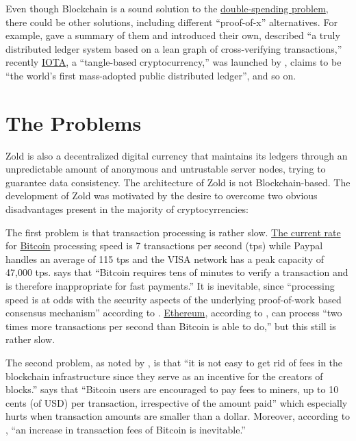 \documentclass{main}
\begin{document}
Even though Blockchain is a sound solution to the
\href{https://en.wikipedia.org/wiki/Double-spending}{double-spending problem},
there could be other solutions,
including different ``proof-of-x'' alternatives.
For example,  gave
a summary of them and introduced their own,
 described
``a truly distributed ledger system based on a lean graph of cross-verifying transactions,''
recently \href{https://www.iota.org/}{IOTA}, a ``tangle-based cryptocurrency,'' was launched by
,
 claims to be ``the world's first mass-adopted public distributed ledger'',
and so on.

\pagebreak

\section*{The Problems}

Zold is also a decentralized digital currency that maintains its ledgers
through an unpredictable amount of anonymous and untrustable server nodes, trying to guarantee
data consistency. The architecture of Zold is not Blockchain-based.
The development of Zold was motivated by the desire to overcome
two obvious disadvantages present in the majority of cryptocyrrencies:

The first problem is that transaction processing is rather slow.
\href{https://goo.gl/sWiAWc}{The current rate} for \href{https://bitcoin.org/}{Bitcoin}
processing speed is 7 transactions per second (tps)
while Paypal handles an average of 115 tps and the VISA
network has a peak capacity of 47,000 tps.
 says that
``Bitcoin requires tens of minutes to verify a transaction
and is therefore inappropriate for fast payments.''
It is inevitable, since
``processing speed is at odds with the security aspects of the underlying
proof-of-work based consensus mechanism'' according
to .
\href{https://ethereum.org/}{Ethereum}, according to , can process
``two times more transactions per second than Bitcoin is able to do,''
but this still is rather slow.

The second problem, as noted by ,
is that ``it is not easy to get rid
of fees in the blockchain infrastructure since they serve
as an incentive for the creators of blocks.''
 says that ``Bitcoin users are encouraged to
pay fees to miners, up to 10 cents (of USD) per transaction, irrespective of the
amount paid'' which especially hurts when transaction amounts are smaller than a dollar.
Moreover, according to ,
``an increase in transaction fees of Bitcoin is inevitable.''
\end{document}
